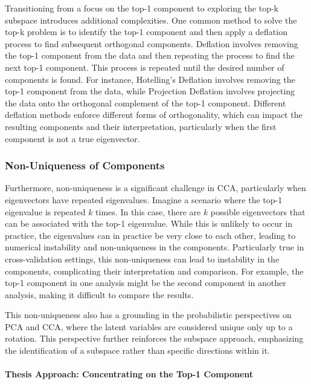 Transitioning from a focus on the top-1 component to exploring the top-k subspace introduces additional complexities. One common method to solve the top-k problem is to identify the top-1 component and then apply a deflation process to find subsequent orthogonal components.
Deflation involves removing the top-1 component from the data and then repeating the process to find the next top-1 component. This process is repeated until the desired number of components is found.
For instance, Hotelling's Deflation \citep{hotelling1933analysis} involves removing the top-1 component from the data, while Projection Deflation \citep{mackey2008deflation} involves projecting the data onto the orthogonal complement of the top-1 component.
Different deflation methods enforce different forms of orthogonality, which can impact the resulting components and their interpretation, particularly when the first component is not a true eigenvector.

\subsubsection{Non-Uniqueness of Components}

Furthermore, non-uniqueness is a significant challenge in CCA, particularly when eigenvectors have repeated eigenvalues. Imagine a scenario where the top-1 eigenvalue is repeated \(k\) times. In this case, there are \(k\) possible eigenvectors that can be associated with the top-1 eigenvalue. While this is unlikely to occur in practice, the eigenvalues can in practice be very close to each other, leading to numerical instability and non-uniqueness in the components. Particularly true in cross-validation settings, this non-uniqueness can lead to instability in the components, complicating their interpretation and comparison.
For example, the top-1 component in one analysis might be the second component in another analysis, making it difficult to compare the results.

This non-uniqueness also has a grounding in the probabilistic perspectives on PCA and CCA, where the latent variables are considered unique only up to a rotation.
This perspective further reinforces the subspace approach, emphasizing the identification of a subspace rather than specific directions within it.

\paragraph{Thesis Approach: Concentrating on the Top-1 Component}

